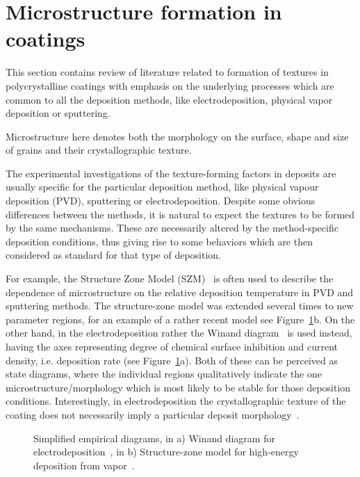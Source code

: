 \section{Microstructure formation in coatings}
This section contains review of literature related to formation of textures in polycrystalline coatings with emphasis on the underlying processes which are common to all the deposition methods, like electrodeposition, physical vapor deposition or sputtering. 

Microstructure here denotes both the morphology on the surface, shape and size of grains and their crystallographic texture.

The experimental investigations of the texture-forming factors in deposits are usually specific for the particular deposition method, like physical vapour deposition (PVD), sputtering or electrodeposition. Despite some obvious differences between the methods, it is natural to expect the textures to be formed by the same mechanisms. These are necessarily altered by the method-specific deposition conditions, thus giving rise to some behaviors which are then considered as standard for that type of deposition. 

For example, the Structure Zone Model (SZM)~\cite{Barna1998, Anders2010} is often used to describe the dependence of microstructure on the relative deposition temperature in PVD and sputtering methods. The structure-zone model was extended several times to new parameter regions, for an example of a rather recent model see Figure~\ref{fig_SZM_and_Winand}b. On the other hand, in the electrodeposition rather the Winand diagram~\cite{Winand1992} is used instead, having the axes representing degree of chemical surface inhibition and current density, i.e. deposition rate (see Figure~\ref{fig_SZM_and_Winand}a). Both of these can be perceived as state diagrams, where the individual regions qualitatively indicate the one microstructure/morphology which is most likely to be stable for those deposition conditions. Interestingly, in electrodeposition the crystallographic texture of the coating does not necessarily imply a particular deposit morphology~\cite{Winand1992}.

\begin{figure}
	\centering
	\caption[Examples of Structure Zone Model and Winand diagram]{Simplified empirical diagrams, in a) Winand diagram for electrodeposition~\cite{Winand1992}, in b) Structure-zone model for high-energy deposition from vapor~\cite{Anders2010}.}
	\label{fig_SZM_and_Winand}
\end{figure}

